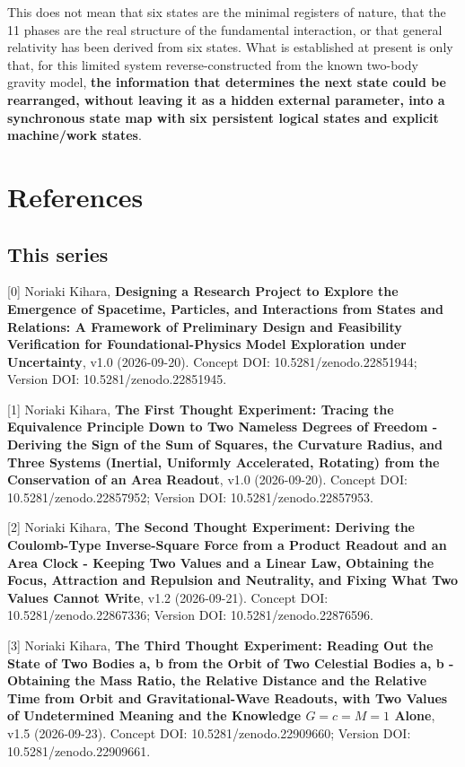 \documentclass[
  a4paper,
]{article}
\begin{document}
This does not mean that six states are the minimal registers of nature,
that the 11 phases are the real structure of the fundamental
interaction, or that general relativity has been derived from six
states. What is established at present is only that, for this limited
system reverse-constructed from the known two-body gravity model,
\textbf{the information that determines the next state could be
rearranged, without leaving it as a hidden external parameter, into a
synchronous state map with six persistent logical states and explicit
machine/work states}.

\section{References}\label{references}

\subsection{This series}\label{this-series}

{[}0{]} Noriaki Kihara, \textbf{Designing a Research Project to Explore
the Emergence of Spacetime, Particles, and Interactions from States and
Relations: A Framework of Preliminary Design and Feasibility
Verification for Foundational-Physics Model Exploration under
Uncertainty}, v1.0 (2026-09-20). Concept DOI: 10.5281/zenodo.22851944;
Version DOI: 10.5281/zenodo.22851945.

{[}1{]} Noriaki Kihara, \textbf{The First Thought Experiment: Tracing
the Equivalence Principle Down to Two Nameless Degrees of Freedom -
Deriving the Sign of the Sum of Squares, the Curvature Radius, and Three
Systems (Inertial, Uniformly Accelerated, Rotating) from the
Conservation of an Area Readout}, v1.0 (2026-09-20). Concept DOI:
10.5281/zenodo.22857952; Version DOI: 10.5281/zenodo.22857953.

{[}2{]} Noriaki Kihara, \textbf{The Second Thought Experiment: Deriving
the Coulomb-Type Inverse-Square Force from a Product Readout and an Area
Clock - Keeping Two Values and a Linear Law, Obtaining the Focus,
Attraction and Repulsion and Neutrality, and Fixing What Two Values
Cannot Write}, v1.2 (2026-09-21). Concept DOI: 10.5281/zenodo.22867336;
Version DOI: 10.5281/zenodo.22876596.

{[}3{]} Noriaki Kihara, \textbf{The Third Thought Experiment: Reading
Out the State of Two Bodies a, b from the Orbit of Two Celestial Bodies
a, b - Obtaining the Mass Ratio, the Relative Distance and the Relative
Time from Orbit and Gravitational-Wave Readouts, with Two Values of
Undetermined Meaning and the Knowledge \(G=c=M=1\) Alone}, v1.5
(2026-09-23). Concept DOI: 10.5281/zenodo.22909660; Version DOI:
10.5281/zenodo.22909661.
\end{document}
